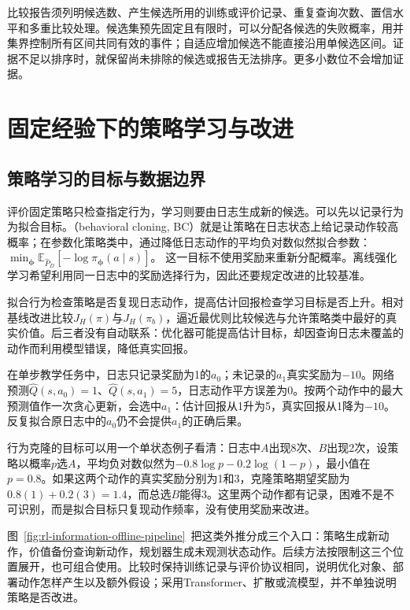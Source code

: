 比较报告须列明候选数、产生候选所用的训练或评价记录、重复查询次数、置信水平和多重比较处理。候选集预先固定且有限时，可以分配各候选的失败概率，用并集界控制所有区间共同有效的事件；自适应增加候选不能直接沿用单候选区间。证据不足以排序时，就保留尚未排除的候选或报告无法排序。更多小数位不会增加证据。

\Needspace{35mm}
\section{固定经验下的策略学习与改进}
\label{sec:rl-information-offline-learning}

\subsection{策略学习的目标与数据边界}
\label{sec:rl-information-learning-boundary}

评价固定策略只检查指定行为，学习则要由日志生成新的候选。可以先以记录行为为拟合目标。（behavioral cloning, BC）就是让策略在日志状态上给记录动作较高概率；在参数化策略类中，通过降低日志动作的平均负对数似然拟合参数：
$\min_{\bm\phi}\mathbb E_{\widehat P_D}[-\log\pi_{\bm\phi}(a\mid s)]$。
这一目标不使用奖励来重新分配概率。离线强化学习希望利用同一日志中的奖励选择行为，因此还要规定改进的比较基准。

拟合行为检查策略是否复现日志动作，提高估计回报检查学习目标是否上升。相对基线改进比较$J_H(\pi)$与$J_H(\pi_b)$，逼近最优则比较候选与允许策略类中最好的真实价值。后三者没有自动联系：优化器可能提高估计目标，却因查询日志未覆盖的动作而利用模型错误，降低真实回报。

\begin{example}[一次贪心更新利用了外推错误]
  \label{ex:rl-information-extrapolation}
  在单步教学任务中，日志只记录奖励为1的$a_0$；未记录的$a_1$真实奖励为$-10$。网络预测$\widehat Q(s,a_0)=1$、$\widehat Q(s,a_1)=5$，日志动作平方误差为0。按两个动作中的最大预测值作一次贪心更新，会选中$a_1$：估计回报从1升为5，真实回报从1降为$-10$。反复拟合原日志中的$a_0$仍不会提供$a_1$的正确后果。
\end{example}

行为克隆的目标可以用一个单状态例子看清：日志中$A$出现8次、$B$出现2次，设策略以概率$p$选$A$，平均负对数似然为$-0.8\log p-0.2\log(1-p)$，最小值在$p=0.8$。如果这两个动作的真实奖励分别为1和3，克隆策略期望奖励为$0.8(1)+0.2(3)=1.4$，而总选$B$能得3。这里两个动作都有记录，困难不是不可识别，而是拟合目标只复现动作频率，没有使用奖励来改进。

图~\ref{fig:rl-information-offline-pipeline}~把这类外推分成三个入口：策略生成新动作，价值备份查询新动作，规划器生成未观测状态动作。后续方法按限制这三个位置展开，也可组合使用。比较时保持训练记录与评价协议相同，说明优化对象、部署动作怎样产生以及额外假设；采用Transformer、扩散或流模型，并不单独说明策略是否改进。

